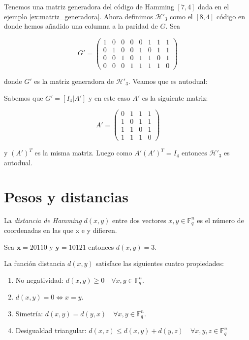 \begin{exampleth}
Tenemos una matriz generadora del código de Hamming $\left[7,4\right]$ dada en el ejemplo \ref{ex:matriz_generadora}. Ahora definimos $\mathcal{H}'_3$ como el $\left[8,4\right]$ código en donde hemos añadido una columna a la paridad de $G$. Sea

\[
G' = \left( \begin{array}{cccc|cccc}
	1 & 0 & 0 & 0 & 0 & 1 & 1 & 1\\
	0 & 1 & 0 & 0 & 1 & 0 & 1 & 1\\
	0 & 0 & 1 & 0 & 1 & 1 & 0 & 1 \\
	0 & 0 & 0 & 1 & 1 & 1 & 1 & 0
			\end{array} 
	\right)
\]

donde $G'$ es la matriz generadora de $\mathcal{H}'_3$. Veamos que es autodual:

Sabemos que $G' = \left[I_4 | A'\right]$  y en este caso $A'$ es la siguiente matriz:

\[
A' = \left( \begin{array}{cccc}
	 0 & 1 & 1 & 1\\
	 1 & 0 & 1 & 1\\
	 1 & 1 & 0 & 1 \\
	 1 & 1 & 1 & 0
			\end{array} 
	\right)	
\]

y $(A')^T$ es la misma matriz. Luego como $A'(A')^T = I_4 $ entonces $\mathcal{H}'_3$ es autodual.

\end{exampleth}

\section{Pesos y distancias}
\begin{definition}
La \textit{distancia de Hamming} $d(x,y)$ entre dos vectores $x,y \in \mathbb{F}_q^n$ es el número de coordenadas en las que x e y difieren. 
\end{definition}

\begin{exampleth}
	Sea $\mathbf{x}=20110$ y $\mathbf{y}=10121$ entonces $d(x,y)=3$.
\end{exampleth}

\begin{theorem}
	La función distancia $d(x,y)$ satisface las siguientes cuatro propiedades:
	\begin{enumerate}
	\item No negatividad: $d(x,y) \geq 0 \quad \forall x,y \in \mathbb{F}_q^n$.
	\item $d(x,y)=0 \Leftrightarrow x = y$.
	\item Simetría: $d(x,y)=d(y,x) \quad \forall x,y \in \mathbb{F}_q^n$.
	\item Desigualdad triangular: $d(x,z)\leq d(x,y) + d(y,z) \quad \forall x,y,z \in \mathbb{F}_q^n$
	\end{enumerate}
	
\end{theorem}


